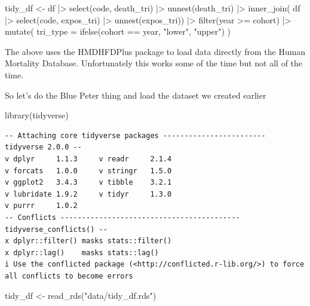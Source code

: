 \documentclass[
  letterpaper,
  DIV=11,
  numbers=noendperiod]{scrartcl}
\newenvironment{Shaded}{\begin{snugshade}}{\end{snugshade}}
\newcommand{\AttributeTok}[1]{\textcolor[rgb]{0.40,0.45,0.13}{#1}}
\newcommand{\FunctionTok}[1]{\textcolor[rgb]{0.28,0.35,0.67}{#1}}
\newcommand{\NormalTok}[1]{\textcolor[rgb]{0.00,0.23,0.31}{#1}}
\newcommand{\OtherTok}[1]{\textcolor[rgb]{0.00,0.23,0.31}{#1}}
\newcommand{\SpecialCharTok}[1]{\textcolor[rgb]{0.37,0.37,0.37}{#1}}
\newcommand{\StringTok}[1]{\textcolor[rgb]{0.13,0.47,0.30}{#1}}
\begin{document}
\begin{Shaded}
\begin{Highlighting}[]
\NormalTok{tidy\_df }\OtherTok{\textless{}{-}} 
\NormalTok{  df }\SpecialCharTok{|\textgreater{}} 
    \FunctionTok{select}\NormalTok{(code, death\_tri) }\SpecialCharTok{|\textgreater{}} 
    \FunctionTok{unnest}\NormalTok{(death\_tri) }\SpecialCharTok{|\textgreater{}} 
    \FunctionTok{inner\_join}\NormalTok{(}
\NormalTok{      df }\SpecialCharTok{|\textgreater{}} 
        \FunctionTok{select}\NormalTok{(code, expos\_tri) }\SpecialCharTok{|\textgreater{}} 
        \FunctionTok{unnest}\NormalTok{(expos\_tri)) }\SpecialCharTok{|\textgreater{}} 
    \FunctionTok{filter}\NormalTok{(year }\SpecialCharTok{\textgreater{}=}\NormalTok{ cohort) }\SpecialCharTok{|\textgreater{}} 
    \FunctionTok{mutate}\NormalTok{(}
      \AttributeTok{tri\_type =} \FunctionTok{ifelse}\NormalTok{(cohort }\SpecialCharTok{==}\NormalTok{ year, }\StringTok{"lower"}\NormalTok{, }\StringTok{"upper"}\NormalTok{)}
\NormalTok{    ) }
\end{Highlighting}
\end{Shaded}

The above uses the HMDHFDPlus package to load data directly from the
Human Mortality Database. Unfortunately this works some of the time but
not all of the time.

So let's do the Blue Peter thing and load the dataset we created earlier

\begin{Shaded}
\begin{Highlighting}[]
\FunctionTok{library}\NormalTok{(tidyverse)}
\end{Highlighting}
\end{Shaded}

\begin{verbatim}
-- Attaching core tidyverse packages ------------------------ tidyverse 2.0.0 --
v dplyr     1.1.3     v readr     2.1.4
v forcats   1.0.0     v stringr   1.5.0
v ggplot2   3.4.3     v tibble    3.2.1
v lubridate 1.9.2     v tidyr     1.3.0
v purrr     1.0.2     
-- Conflicts ------------------------------------------ tidyverse_conflicts() --
x dplyr::filter() masks stats::filter()
x dplyr::lag()    masks stats::lag()
i Use the conflicted package (<http://conflicted.r-lib.org/>) to force all conflicts to become errors
\end{verbatim}

\begin{Shaded}
\begin{Highlighting}[]
\NormalTok{tidy\_df }\OtherTok{\textless{}{-}} \FunctionTok{read\_rds}\NormalTok{(}\StringTok{"data/tidy\_df.rds"}\NormalTok{)}
\end{Highlighting}
\end{Shaded}
\end{document}
